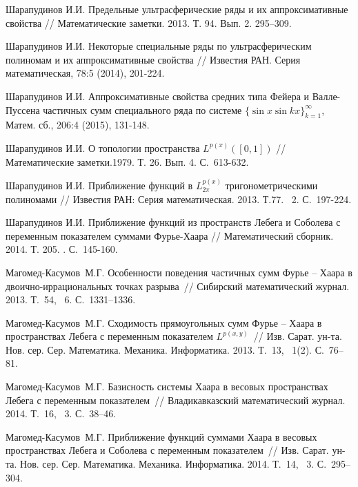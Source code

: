 \begin{thebibliography}{111}


Шарапудинов И.И. Предельные ультрасферические ряды и их
аппроксимативные свойства // Математические заметки. 2013. Т. 94. Вып. 2. 295–309.

Шарапудинов И.И. Некоторые специальные ряды по ультрасферическим полиномам  и их аппроксимативные свойства //
Известия РАН. Серия математическая, 78:5 (2014),  201-224.

Шарапудинов И.И. Аппроксимативные свойства средних типа Фейера и Валле-Пуссена частичных сумм специального ряда по системе $\{ \sin x\sin kx\}_{k=1}^\infty$, Матем. сб., 206:4 (2015), 131-148.

Шарапудинов И.И. О топологии пространства
$ L^{p(x)}([0,1])$ // Математические заметки.1979. Т. 26. Вып. 4. С.~613-632.

Шарапудинов И.И. Приближение функций в $L^{p(x)}_{2\pi}$ тригонометрическими полиномами // Известия РАН: Серия математическая. 2013. Т.77. \textnumero~2. С.~197-224.




Шарапудинов И.И. Приближение функций из пространств Лебега и Соболева с переменным показателем суммами Фурье-Хаара // Математический сборник. 2014. Т. 205. . С.~145-160.

Магомед-Касумов~М.Г. Особенности поведения частичных сумм Фурье -- Хаара в двоично-иррациональных точках разрыва~//	Сибирский математический журнал. 2013. Т.~54, \textnumero~6. {С.}~1331--1336.




Магомед-Касумов~М.Г. Сходимость	прямоугольных сумм Фурье -- Хаара в	пространствах Лебега с переменным показателем $L^{p(x,y)}$~// Изв. Сарат. ун-та. Нов.	сер. Сер. Математика. Механика.	Информатика. 2013. Т.~13, {\textnumero}~1(2). {С.}~76--81.




Магомед-Касумов~М.Г. Базисность системы	Хаара в весовых пространствах Лебега с переменным показателем~// Владикавказский 	математический журнал. 2014. Т.~16, {\textnumero}~3. {С.}~38--46.




Магомед-Касумов~М.Г. Приближение функций суммами Хаара в весовых пространствах Лебега и Соболева с переменным показателем~// Изв. Сарат. ун-та. Нов. сер.	Сер. Математика. Механика. Информатика. 2014. Т.~14, {\textnumero}~3. {С.}~295--304.





\end{thebibliography}
